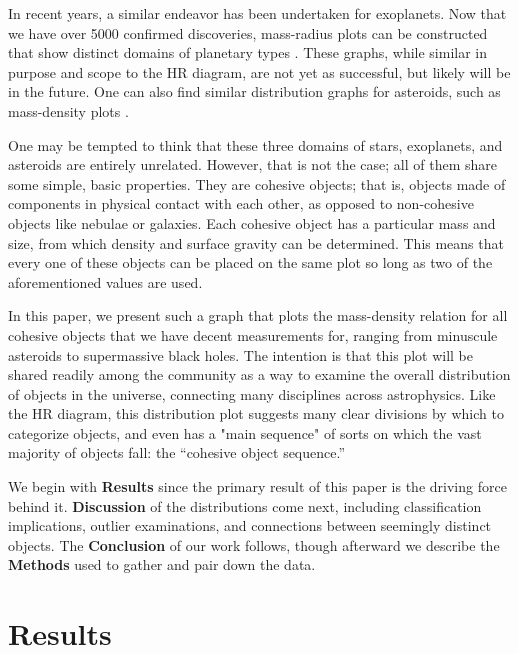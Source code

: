 \documentclass[twocolumn,linenumbers]{aastex631}
\begin{document}
In recent years, a similar endeavor has been undertaken for exoplanets. Now that we have over 5000 confirmed discoveries, mass-radius plots can be constructed that show distinct domains of planetary types \citep{Chen2016, Muller2024}. These graphs, while similar in purpose and scope to the HR diagram, are not yet as successful, but likely will be in the future. One can also find similar distribution graphs for asteroids, such as mass-density plots \citep{Carry2012}. 

One may be tempted to think that these three domains of stars, exoplanets, and asteroids are entirely unrelated. However, that is not the case; all of them share some simple, basic properties. They are cohesive objects; that is, objects made of components in physical contact with each other, as opposed to non-cohesive objects like nebulae or galaxies. Each cohesive object has a particular mass and size, from which density and surface gravity can be determined. This means that every one of these objects can be placed on the same plot so long as two of the aforementioned values are used. 

In this paper, we present such a graph that plots the mass-density relation for all cohesive objects that we have decent measurements for, ranging from minuscule asteroids to supermassive black holes. The intention is that this plot will be shared readily among the community as a way to examine the overall distribution of objects in the universe, connecting many disciplines across astrophysics. Like the HR diagram, this distribution plot suggests many clear divisions by which to categorize objects, and even has a "main sequence" of sorts on which the vast majority of objects fall: the ``cohesive object sequence.'' 

We begin with \textbf{Results} since the primary result of this paper is the driving force behind it. \textbf{Discussion} of the distributions come next, including classification implications, outlier examinations, and connections between seemingly distinct objects. The \textbf{Conclusion} of our work follows, though afterward we describe the \textbf{Methods} used to gather and pair down the data. 

\section{Results} \label{sec:intro}
\end{document}
